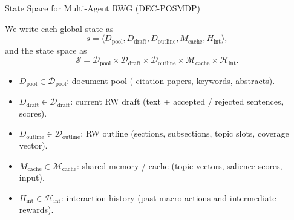     

\begin{frame}{State Space for Multi-Agent RWG (DEC-POSMDP)}
\vspace{-10mm}
\small

We write each global state as
\[
s = \big\langle
  D_{\mathrm{pool}},
  D_{\mathrm{draft}},
  D_{\mathrm{outline}},
  M_{\mathrm{cache}},
  H_{\mathrm{int}}
\big\rangle,
\]
and the state space as
\[
\mathcal{S}
= \mathcal{D}_{\mathrm{pool}}
  \times \mathcal{D}_{\mathrm{draft}}
  \times \mathcal{D}_{\mathrm{outline}}
  \times \mathcal{M}_{\mathrm{cache}}
  \times \mathcal{H}_{\mathrm{int}}.
\]

\begin{itemize}\itemsep2pt
  \item $D_{\mathrm{pool}} \in \mathcal{D}_{\mathrm{pool}}$:
        document pool ( citation papers, keywords, abstracts).
  \item $D_{\mathrm{draft}} \in \mathcal{D}_{\mathrm{draft}}$:
        current RW draft (text + accepted / rejected sentences, scores).
  \item $D_{\mathrm{outline}} \in \mathcal{D}_{\mathrm{outline}}$:
        RW outline (sections, subsections, topic slots, coverage vector).
  \item $M_{\mathrm{cache}} \in \mathcal{M}_{\mathrm{cache}}$:
        shared memory / cache (topic vectors, salience scores, input).
  \item $H_{\mathrm{int}} \in \mathcal{H}_{\mathrm{int}}$:
        interaction history (past macro-actions and intermediate rewards).
\end{itemize}

\end{frame}


